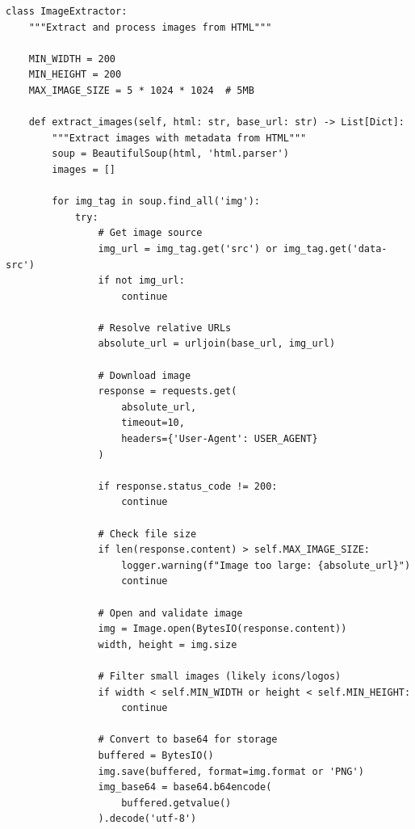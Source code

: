 \begin{lstlisting}
class ImageExtractor:
    """Extract and process images from HTML"""
    
    MIN_WIDTH = 200
    MIN_HEIGHT = 200
    MAX_IMAGE_SIZE = 5 * 1024 * 1024  # 5MB
    
    def extract_images(self, html: str, base_url: str) -> List[Dict]:
        """Extract images with metadata from HTML"""
        soup = BeautifulSoup(html, 'html.parser')
        images = []
        
        for img_tag in soup.find_all('img'):
            try:
                # Get image source
                img_url = img_tag.get('src') or img_tag.get('data-src')
                if not img_url:
                    continue
                
                # Resolve relative URLs
                absolute_url = urljoin(base_url, img_url)
                
                # Download image
                response = requests.get(
                    absolute_url, 
                    timeout=10,
                    headers={'User-Agent': USER_AGENT}
                )
                
                if response.status_code != 200:
                    continue
                
                # Check file size
                if len(response.content) > self.MAX_IMAGE_SIZE:
                    logger.warning(f"Image too large: {absolute_url}")
                    continue
                
                # Open and validate image
                img = Image.open(BytesIO(response.content))
                width, height = img.size
                
                # Filter small images (likely icons/logos)
                if width < self.MIN_WIDTH or height < self.MIN_HEIGHT:
                    continue
                
                # Convert to base64 for storage
                buffered = BytesIO()
                img.save(buffered, format=img.format or 'PNG')
                img_base64 = base64.b64encode(
                    buffered.getvalue()
                ).decode('utf-8')
                

\end{lstlisting}
